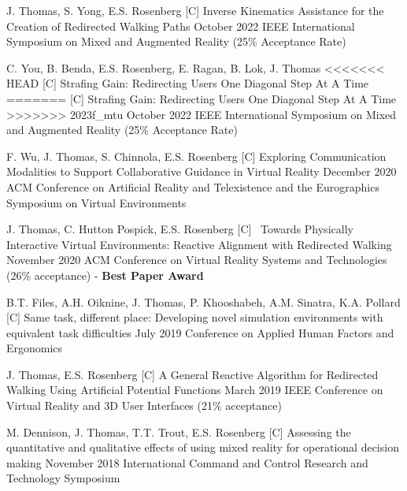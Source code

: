 \setcounter{npubs}{1}
\begin{cvpubs}
  \cvpub
    {J. Thomas, S. Yong, E.S. Rosenberg} %
    {[C\thenpubs] Inverse Kinematics Assistance for the Creation of Redirected Walking Paths} %
    {October 2022} %
    {IEEE International Symposium on Mixed and Augmented Reality (25\% Acceptance Rate)} %
      
  \cvpub
    {C. You, B. Benda, E.S. Rosenberg, E. Ragan, B. Lok, J. Thomas} %
<<<<<<< HEAD
	{[C\thenpubs] Strafing Gain: Redirecting Users One Diagonal Step At A Time }%
=======
    {[C\thenpubs] Strafing Gain: Redirecting Users One Diagonal Step At A Time} %
>>>>>>> 2023f_mtu
    {October 2022} %
    {IEEE International Symposium on Mixed and Augmented Reality (25\% Acceptance Rate)} %
    
  \cvpub
    {F. Wu, J. Thomas, S. Chinnola, E.S. Rosenberg} %
    {[C\thenpubs] Exploring Communication Modalities to Support Collaborative Guidance in Virtual Reality} %
    {December 2020} %
    {ACM Conference on Artificial Reality and Telexistence and the Eurographics Symposium on Virtual Environments}%
    
  \cvpub
    {J. Thomas, C. Hutton Pospick, E.S. Rosenberg} %
    {[C\thenpubs]\ \textcolor{awesome}{\faTrophy} Towards Physically Interactive Virtual Environments: Reactive Alignment with Redirected Walking} %
    {November 2020} %
    {ACM Conference on Virtual Reality Systems and Technologies (26\% acceptance) - \textbf{Best Paper Award}}
    
  \cvpub
    {B.T. Files, A.H. Oiknine, J. Thomas, P. Khooshabeh, A.M. Sinatra, K.A. Pollard} %
    {[C\thenpubs] Same task, different place: Developing novel simulation environments with equivalent task difficulties} %
    {July 2019} %
    {Conference on Applied Human Factors and Ergonomics} %
    
  \cvpub
    {J. Thomas, E.S. Rosenberg} %
    {[C\thenpubs] A General Reactive Algorithm for Redirected Walking Using Artificial Potential Functions} %
    {March 2019} %
    {IEEE Conference on Virtual Reality and 3D User Interfaces (21\% acceptance)}
    
  \cvpub
    {M. Dennison, J. Thomas, T.T. Trout, E.S. Rosenberg} %
    {[C\thenpubs] Assessing the quantitative and qualitative effects of using mixed reality for operational decision making} %
    {November 2018} %
    {International Command and Control Research and Technology Symposium} %
    

\end{cvpubs}
